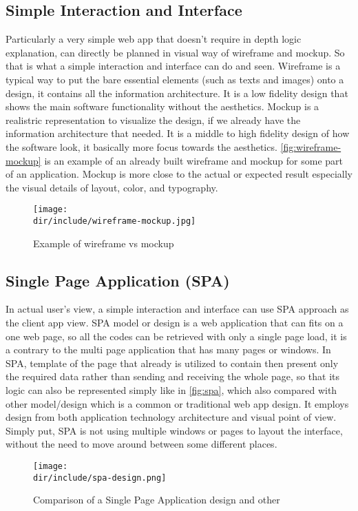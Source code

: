 \subsection{Simple Interaction and Interface}
\label{ssec:simple-interfaction}

Particularly a very simple web app that doesn't require in depth logic explanation, can directly be planned in visual way of wireframe and mockup.
So that is what a simple interaction and interface can do and seen.
Wireframe is a typical way to put the bare essential elements (such as texts and images) onto a design, it contains all the information architecture.
It is a low fidelity design that shows the main software functionality without the aesthetics.
Mockup is a realistric representation to visualize the design, if we already have the information architecture that needed.
It is a middle to high fidelity design of how the software look, it basically more focus towards the aesthetics.
\autoref{fig:wireframe-mockup} is an example of an already built wireframe and mockup for some part of an application.
Mockup is more close to the actual or expected result especially the visual details of layout, color, and typography.

\begin{figure}[htbp]
  \centering
  \texttt{[image: \\dir/include/wireframe-mockup.jpg]}
  \caption[Wireframe vs Mockup Example]{Example of wireframe vs mockup \autocite{Trentini2015WM}}
  \label{fig:wireframe-mockup}
\end{figure}

\subsection{Single Page Application (SPA)}
\label{ssec:spa}

In actual user's view, a simple interaction and interface can use \ac{SPA} approach as the client app view.
\ac{SPA} model or design is a web application that can fits on a one web page, so all the codes can be retrieved with only a single page load, it is a contrary to the multi page application that has many pages or windows.
In \ac{SPA}, template of the page that already is utilized to contain then present only the required data rather than sending and receiving the whole page, so that its logic can also be represented simply like in \autoref{fig:spa}, which also compared with other model/design which is a common or traditional web app design.
It employs design from both application technology architecture and visual point of view.
Simply put, \ac{SPA} is not using multiple windows or pages to layout the interface, without the need to move around between some different places.

\begin{figure}[htbp]
  \centering
  \texttt{[image: \\dir/include/spa-design.png]}
  \caption[Single Page Application design comparison]{Comparison of a Single Page Application design and other}
  \label{fig:spa}
\end{figure}
